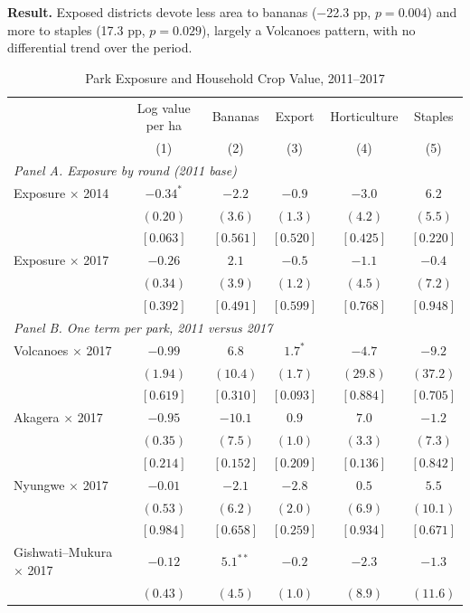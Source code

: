 \documentclass[11pt]{article}
\begin{document}
\textbf{Result.} Exposed districts devote less area to bananas ($-$22.3 pp, $p=0.004$) and more to staples (17.3 pp, $p=0.029$), largely a Volcanoes pattern, with no differential trend over the period.
\clearpage
\begin{table}[H]
\centering\small\setlength{\tabcolsep}{4pt}
\caption{Park Exposure and Household Crop Value, 2011--2017}
\label{tab:crop_value}
\begin{tabular}{lccccc}
\toprule
 & Log value per ha & Bananas & Export & Horticulture & Staples \\
 & (1) & (2) & (3) & (4) & (5) \\
\midrule
\multicolumn{6}{l}{\textit{Panel A. Exposure by round (2011 base)}} \\
Exposure $\times$ 2014 & $-0.34^{*}$ & $-2.2$ & $-0.9$ & $-3.0$ & $6.2$ \\
 & $(0.20)$ & $(3.6)$ & $(1.3)$ & $(4.2)$ & $(5.5)$ \\
 & $[0.063]$ & $[0.561]$ & $[0.520]$ & $[0.425]$ & $[0.220]$ \\
Exposure $\times$ 2017 & $-0.26$ & $2.1$ & $-0.5$ & $-1.1$ & $-0.4$ \\
 & $(0.34)$ & $(3.9)$ & $(1.2)$ & $(4.5)$ & $(7.2)$ \\
 & $[0.392]$ & $[0.491]$ & $[0.599]$ & $[0.768]$ & $[0.948]$ \\
\multicolumn{6}{l}{\textit{Panel B. One term per park, 2011 versus 2017}} \\
Volcanoes $\times$ 2017 & $-0.99$ & $6.8$ & $1.7^{*}$ & $-4.7$ & $-9.2$ \\
 & $(1.94)$ & $(10.4)$ & $(1.7)$ & $(29.8)$ & $(37.2)$ \\
 & $[0.619]$ & $[0.310]$ & $[0.093]$ & $[0.884]$ & $[0.705]$ \\
Akagera $\times$ 2017 & $-0.95$ & $-10.1$ & $0.9$ & $7.0$ & $-1.2$ \\
 & $(0.35)$ & $(7.5)$ & $(1.0)$ & $(3.3)$ & $(7.3)$ \\
 & $[0.214]$ & $[0.152]$ & $[0.209]$ & $[0.136]$ & $[0.842]$ \\
Nyungwe $\times$ 2017 & $-0.01$ & $-2.1$ & $-2.8$ & $0.5$ & $5.5$ \\
 & $(0.53)$ & $(6.2)$ & $(2.0)$ & $(6.9)$ & $(10.1)$ \\
 & $[0.984]$ & $[0.658]$ & $[0.259]$ & $[0.934]$ & $[0.671]$ \\
Gishwati--Mukura $\times$ 2017 & $-0.12$ & $5.1^{**}$ & $-0.2$ & $-2.3$ & $-1.3$ \\
 & $(0.43)$ & $(4.5)$ & $(1.0)$ & $(8.9)$ & $(11.6)$ \\

\end{tabular}
\end{table}
\end{document}
